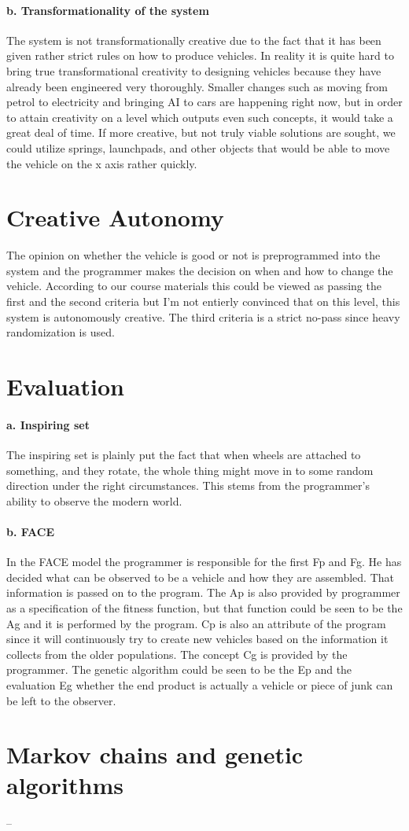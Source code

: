 \documentclass[english]{tktltiki}
\begin{document}
\paragraph{b. Transformationality of the system}
The system is not transformationally creative due to the fact that it has been given rather strict rules on how to produce vehicles. In reality it is quite hard to bring true transformational creativity
to designing vehicles because they have already been engineered very thoroughly. Smaller changes such as moving from petrol to electricity and bringing AI to cars are happening right now, but in order to
attain creativity on a level which outputs even such concepts, it would take a great deal of time.
If more creative, but not truly viable solutions are sought, we could utilize springs, launchpads, and other objects that would be able to move the vehicle on the x axis rather quickly.

\pagebreak
\section{Creative Autonomy}
The opinion on whether the vehicle is good or not is preprogrammed into the system and the programmer makes the decision on when and how to change the vehicle. According to our course materials
this could be viewed as passing the first and the second criteria but I'm not entierly convinced that on this level, this system is autonomously creative. The third criteria is a strict no-pass since
heavy randomization is used.

\section{Evaluation}

\paragraph{a. Inspiring set}
The inspiring set is plainly put the fact that when wheels are attached to something, and they rotate, the whole thing might move in to some random direction under the right circumstances. This stems
from the programmer's ability to observe the modern world.

\paragraph{b. FACE}
In the FACE model the programmer is responsible for the first Fp and Fg. He has decided what can be observed to be a vehicle and how they are assembled. That information is passed on to the program.
The Ap is also provided by programmer as a specification of the fitness function, but that function could be seen to be the Ag and it is performed by the program. Cp is also an attribute of the program
since it will continuously try to create new vehicles based on the information it collects from the older populations. The concept Cg is provided by the programmer. The genetic algorithm could be seen to be the
Ep and the evaluation Eg whether the end product is actually a vehicle or piece of junk can be left to the observer.

\pagebreak
\section{Markov chains and genetic algorithms}

–




%
%
\end{document}
